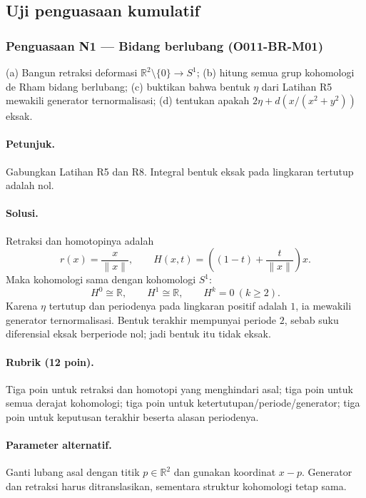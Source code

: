 \subsection{Uji penguasaan kumulatif}

\subsubsection*{Penguasaan N1 — Bidang berlubang (O011-BR-M01)}
\label{o011-br-m01}

(a) Bangun retraksi deformasi $\mathbb R^2\setminus\{0\}\to S^1$; (b) hitung
semua grup kohomologi de Rham bidang berlubang; (c) buktikan bahwa bentuk
$\eta$ dari Latihan R5 mewakili generator ternormalisasi; (d) tentukan apakah
$2\eta+d(x/(x^2+y^2))$ eksak.

\paragraph{Petunjuk.}
Gabungkan Latihan R5 dan R8. Integral bentuk eksak pada lingkaran tertutup
adalah nol.

\paragraph{Solusi.}
Retraksi dan homotopinya adalah
\[
 r(x)=\frac{x}{\|x\|},
 \qquad H(x,t)=\left((1-t)+\frac t{\|x\|}\right)x.
\]
Maka kohomologi sama dengan kohomologi $S^1$:
\[
 H^0\cong\mathbb R,\qquad H^1\cong\mathbb R,
 \qquad H^k=0\ (k\ge2).
\]
Karena $\eta$ tertutup dan periodenya pada lingkaran positif adalah $1$, ia
mewakili generator ternormalisasi. Bentuk terakhir mempunyai periode $2$,
sebab suku diferensial eksak berperiode nol; jadi bentuk itu tidak eksak.

\paragraph{Rubrik (12 poin).}
Tiga poin untuk retraksi dan homotopi yang menghindari asal; tiga poin untuk
semua derajat kohomologi; tiga poin untuk ketertutupan/periode/generator;
tiga poin untuk keputusan terakhir beserta alasan periodenya.

\paragraph{Parameter alternatif.}
Ganti lubang asal dengan titik $p\in\mathbb R^2$ dan gunakan koordinat
$x-p$. Generator dan retraksi harus ditranslasikan, sementara struktur
kohomologi tetap sama.

